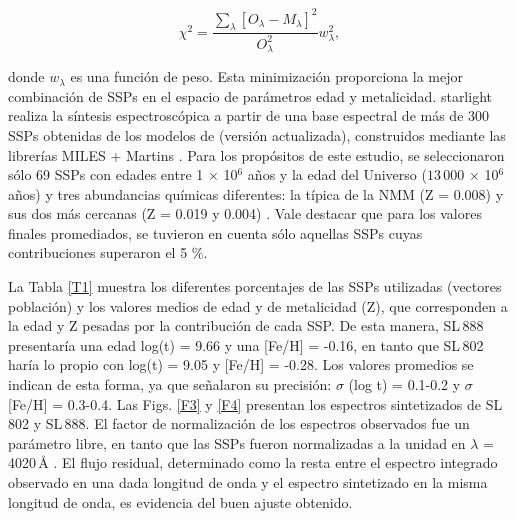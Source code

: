 \documentclass[baaa]{baaa}
\begin{document}
\vspace{0.5cm}
\begin{equation} 
\chi^{2}=\frac{\sum_{\lambda}^{}[O_{\lambda}-M_{\lambda}]^2 } {O_{\lambda}^2}  w_{\lambda}^2 , 
\end{equation} 
\vspace{0.5cm}

\noindent donde ${w_{\lambda}}$ es una función de peso. Esta minimización proporciona la mejor combinación de SSPs en el espacio de parámetros edad y metalicidad. {\sc starlight} realiza la síntesis espectroscópica a partir de una base espectral de más de 300 SSPs obtenidas de los modelos de \citep{BC2003} (versión actualizada), construidos mediante las librerías  MILES + Martins \citep{SB2006,Martins2005}. Para los propósitos de este estudio, se seleccionaron sólo 69 SSPs con edades entre 1 $\times$ 10$^{6}$ años y la edad del Universo ($13\,000$ $\times$ 10$^{6}$ años) y tres abundancias químicas diferentes: la típica de la NMM (Z = 0.008) y sus dos más cercanas (Z = 0.019 y 0.004) \citep{SR2023}. Vale destacar que para los valores finales promediados, se tuvieron en cuenta sólo aquellas SSPs cuyas contribuciones superaron el 5 $\%$.

La Tabla \ref{T1} muestra los diferentes porcentajes de las SSPs utilizadas (vectores población) y los valores medios de edad y de metalicidad (Z), que corresponden a la edad y Z pesadas por la contribución de cada SSP. De esta manera, SL\,888 presentaría una edad log(t) = 9.66 y una [Fe/H] = -0.16, en tanto que SL\,802 haría lo propio con log(t) = 9.05 y [Fe/H] = -0.28. Los valores promedios se indican de esta forma, ya que \cite{GD_CF_2010} señalaron su precisión: $\sigma$ (log t) = 0.1-0.2 y $\sigma$[Fe/H] = 0.3-0.4. Las Figs. \ref{F3} y \ref{F4} presentan los espectros sintetizados de SL\,802 y SL\,888. El factor de normalización de los espectros observados fue un parámetro libre, en tanto que las SSPs fueron normalizadas a la unidad en $\lambda$ = 4020\,\r{A} \citep{CF2010C}. El flujo residual, determinado como la resta entre el espectro integrado observado en una dada longitud de onda y el espectro sintetizado en la misma longitud de onda, es evidencia del buen ajuste obtenido.
\end{document}
